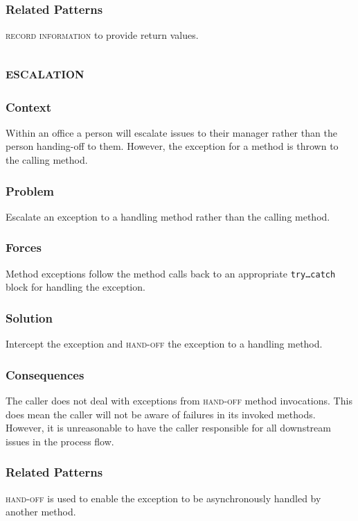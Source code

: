 \documentclass[prodmode]{style/acmlarge}
\begin{document}
\subsubsection*{Related Patterns} \textsc{record information} to provide return
values.



\subsection{\textsc{\textbf{escalation}}}

\subsubsection*{Context} Within an office a person will escalate issues to their
manager rather than the person handing-off to them.  However, the exception for
a method is thrown to the calling method.

\subsubsection*{Problem} Escalate an exception to a handling method rather than
the calling method.

\subsubsection*{Forces} Method exceptions follow the method calls back to an
appropriate \texttt{try\ldots catch} block for handling the exception.

\subsubsection*{Solution} Intercept the exception and \textsc{hand-off} the
exception to a handling method.

\subsubsection*{Consequences} The caller does not deal with exceptions from
\textsc{hand-off} method invocations.  This does mean the caller will not be
aware of failures in its invoked methods.  However, it is unreasonable to have
the caller responsible for all downstream issues in the process flow.

\subsubsection*{Related Patterns} \textsc{hand-off} is used to enable the
exception to be asynchronously handled by another method.
\end{document}
